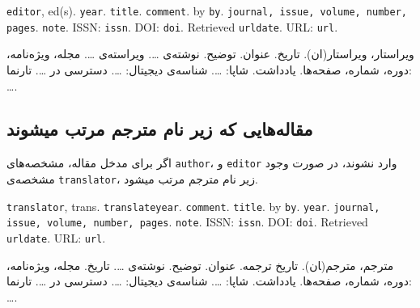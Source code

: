 \documentclass[a4paper,11pt]{article}
\begin{document}
\begin{itemize}[nosep]
\begin{latin}
\item[] []
{\tt editor}, ed(s). {\tt year}. {\tt title}. {\tt comment}. by {\tt by}. {\tt journal, issue, volume, number, pages}. {\tt note}. ISSN: {\tt issn}. DOI: {\tt doi}. Retrieved {\tt urldate}. URL: {\tt url}. 
\end{latin}

\item[] []
{\persianttfamily ویراستار}، ویراستار(ان). {\persianttfamily تاریخ}. {\persianttfamily عنوان}. {\persianttfamily توضیح}. نوشته‌ی {\persianttfamily …}. ویراسته‌ی {\persianttfamily …}. {\persianttfamily مجله، ویژه‌نامه، دوره، شماره، صفحه‌ها}. {\persianttfamily یادداشت}. شاپا: {\persianttfamily …}. شناسه‌ی دیجیتال: {\persianttfamily …}. دسترسی در {\persianttfamily …}. تارنما: {\persianttfamily …}. 
\end{itemize}





\subsection{مقاله‌هایی که زیر نام مترجم مرتب میشوند}
اگر برای مدخل مقاله، مشخصه‌های \verb|author|، و \verb|editor| وارد نشوند، در صورت وجود مشخصه‌ی \verb|translator|، زیر نام مترجم مرتب میشود.

\begin{itemize}[nosep]
\begin{latin}
\item[] []
{\tt translator}, trans. {\tt translateyear}. {\tt comment}. {\tt title}. by {\tt by}. {\tt year}. {\tt journal, issue, volume, number, pages}. {\tt note}. ISSN: {\tt issn}. DOI: {\tt doi}. Retrieved {\tt urldate}. URL: {\tt url}. 
\end{latin}

\item[] []
{\persianttfamily مترجم}، مترجم(‍ان). {\persianttfamily تاریخ ترجمه}. {\persianttfamily عنوان}. {\persianttfamily توضیح}. نوشته‌ی {\persianttfamily …}. {\persianttfamily تاریخ}. {\persianttfamily مجله، ویژه‌نامه، دوره، شماره، صفحه‌ها}. {\persianttfamily یادداشت}. شاپا: {\persianttfamily …}. شناسه‌ی دیجیتال: {\persianttfamily …}. دسترسی در {\persianttfamily …}. تارنما: {\persianttfamily …}. 
\end{itemize}
\end{document}
